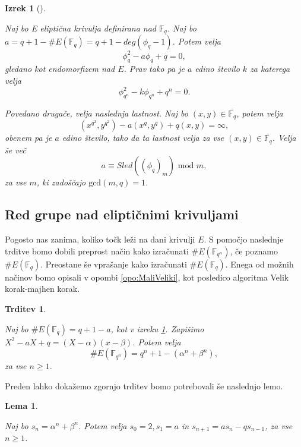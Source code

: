 \documentclass[12pt,a4paper,twoside]{article}
\theoremstyle{definition} %
\theoremstyle{plain} %
\newtheorem{lema}[definicija]{Lema}
\newtheorem{izrek}[definicija]{Izrek}
\newtheorem{trditev}[definicija]{Trditev}
\numberwithin{equation}{section}  %
\newcommand{\F}{\mathbb F}
\newcommand{\E}[1]{E({#1})}
\begin{document}
\begin{izrek}[]~

\label{izrek:4.10}

Naj bo E eliptična krivulja definirana nad $\F_q$. Naj bo $a = q+1-\#\E{\F_q} = q+1-deg(\phi_q-1)$. Potem velja
$$\phi^2_q-a\phi_q+q = 0,$$
gledano kot endomorfizem nad $E$. Prav tako pa je $a$ edino število $k$ za katerega velja
$$\phi^2_{q^n}-k\phi_{q^n}+q^n = 0.$$

Povedano drugače, velja naslednja lastnost. Naj bo $(x,y) \in  \overline{\F_q}$, potem velja
$$(x^{q^2},y^{q^2})-a(x^q,y^q)+q(x,y) = \infty,$$
obenem pa je $a$ edino število, tako da ta lastnost velja za vse $(x,y) \in \overline{\F_q} $. Velja še več
$$a \equiv Sled((\phi_q)_m) \text{ mod } m,$$
za vse $m$, ki zadoščajo $\text{gcd}(m,q)=1$.

\end{izrek}

\subsection{Red grupe nad eliptičnimi krivuljami}


Pogosto nas zanima, koliko točk leži na dani krivulji $E$. S pomočjo naslednje trditve bomo dobili preprost način kako izračunati $\# \E{\F_{q^n}}$, če poznamo $\# \E{\F_q}$.
Preostane še vprašanje kako izračunati $\# \E{\F_q}$. Enega od možnih načinov bomo opisali v opombi \ref{opo:MaliVeliki}, kot posledico algoritma Velik korak-majhen korak.




\begin{trditev}~

\label{trd:4.12}

Naj bo $\# \E{\F_q} = q+1-a$, kot v izreku \ref{izrek:4.10}. Zapišimo $X^2-aX+q = (X-\alpha)(x-\beta)$. Potem velja
$$\# \E{\F_{q^{n}}} = q^n+1-(\alpha^n+\beta^n),$$
za vse $n \geq 1$.

\end{trditev}

Preden lahko dokažemo zgornjo trditev bomo potrebovali še naslednjo lemo.

\begin{lema}~

\label{lema:4.13}
Naj bo $s_n = \alpha^n +  \beta^n$. Potem velja $s_0 = 2,s_1 = a$ in $ s_{n+1} = as_n-qs_{n-1}$, za vse $n \geq 1$.

\end{lema}
\end{document}
